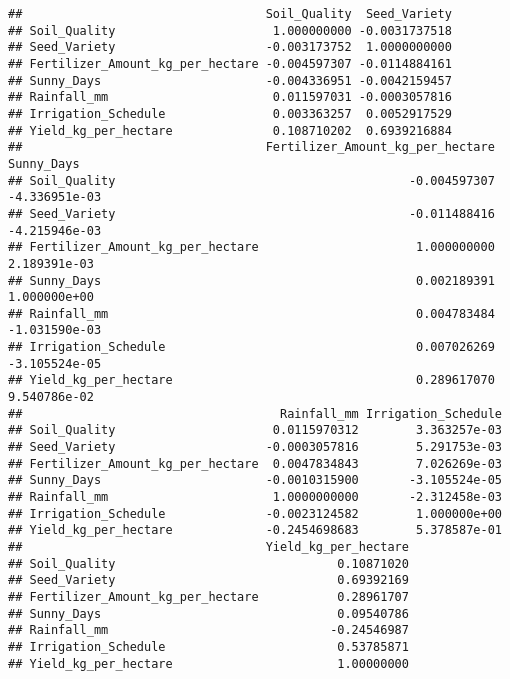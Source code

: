 \documentclass[
]{article}
\begin{document}
\begin{verbatim}
##                                  Soil_Quality  Seed_Variety
## Soil_Quality                      1.000000000 -0.0031737518
## Seed_Variety                     -0.003173752  1.0000000000
## Fertilizer_Amount_kg_per_hectare -0.004597307 -0.0114884161
## Sunny_Days                       -0.004336951 -0.0042159457
## Rainfall_mm                       0.011597031 -0.0003057816
## Irrigation_Schedule               0.003363257  0.0052917529
## Yield_kg_per_hectare              0.108710202  0.6939216884
##                                  Fertilizer_Amount_kg_per_hectare    Sunny_Days
## Soil_Quality                                         -0.004597307 -4.336951e-03
## Seed_Variety                                         -0.011488416 -4.215946e-03
## Fertilizer_Amount_kg_per_hectare                      1.000000000  2.189391e-03
## Sunny_Days                                            0.002189391  1.000000e+00
## Rainfall_mm                                           0.004783484 -1.031590e-03
## Irrigation_Schedule                                   0.007026269 -3.105524e-05
## Yield_kg_per_hectare                                  0.289617070  9.540786e-02
##                                    Rainfall_mm Irrigation_Schedule
## Soil_Quality                      0.0115970312        3.363257e-03
## Seed_Variety                     -0.0003057816        5.291753e-03
## Fertilizer_Amount_kg_per_hectare  0.0047834843        7.026269e-03
## Sunny_Days                       -0.0010315900       -3.105524e-05
## Rainfall_mm                       1.0000000000       -2.312458e-03
## Irrigation_Schedule              -0.0023124582        1.000000e+00
## Yield_kg_per_hectare             -0.2454698683        5.378587e-01
##                                  Yield_kg_per_hectare
## Soil_Quality                               0.10871020
## Seed_Variety                               0.69392169
## Fertilizer_Amount_kg_per_hectare           0.28961707
## Sunny_Days                                 0.09540786
## Rainfall_mm                               -0.24546987
## Irrigation_Schedule                        0.53785871
## Yield_kg_per_hectare                       1.00000000
\end{verbatim}
\end{document}
